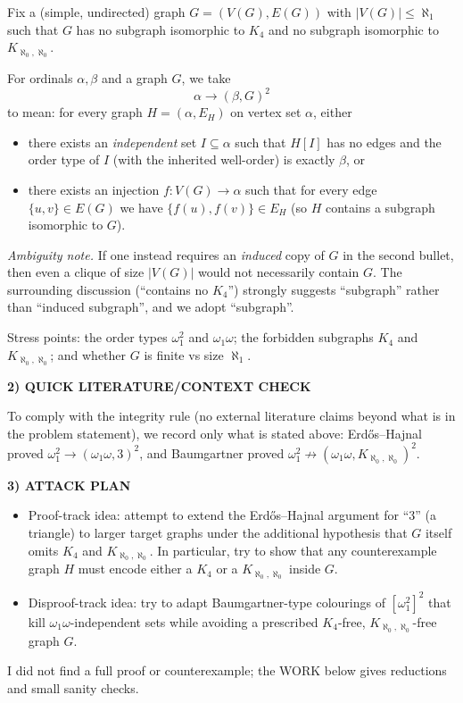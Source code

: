 Fix a (simple, undirected) graph $G=(V(G),E(G))$ with $|V(G)|\le\aleph_1$ such that $G$ has no subgraph isomorphic to $K_4$ and no subgraph isomorphic to $K_{\aleph_0,\aleph_0}$.

For ordinals $\alpha,\beta$ and a graph $G$, we take
\[
\alpha\to(\beta,G)^2
\]
to mean: for every graph $H=(\alpha,E_H)$ on vertex set $\alpha$, either
\begin{itemize}
\item there exists an \emph{independent} set $I\subseteq\alpha$ such that $H[I]$ has no edges and the order type of $I$ (with the inherited well-order) is exactly $\beta$, or
\item there exists an injection $f:V(G)\to\alpha$ such that for every edge $\{u,v\}\in E(G)$ we have $\{f(u),f(v)\}\in E_H$ (so $H$ contains a subgraph isomorphic to $G$).
\end{itemize}

\emph{Ambiguity note.} If one instead requires an \emph{induced} copy of $G$ in the second bullet, then even a clique of size $|V(G)|$ would not necessarily contain $G$. The surrounding discussion (``contains no $K_4$'') strongly suggests ``subgraph'' rather than ``induced subgraph'', and we adopt ``subgraph''.

Stress points: the order types $\omega_1^2$ and $\omega_1\omega$; the forbidden subgraphs $K_4$ and $K_{\aleph_0,\aleph_0}$; and whether $G$ is finite vs size $\aleph_1$.

\noindent\textbf{2) QUICK LITERATURE/CONTEXT CHECK}\par
To comply with the integrity rule (no external literature claims beyond what is in the problem statement), we record only what is stated above: Erd\H{o}s--Hajnal proved $\omega_1^2\to(\omega_1\omega,3)^2$, and Baumgartner proved $\omega_1^2\not\to(\omega_1\omega,K_{\aleph_0,\aleph_0})^2$.

\noindent\textbf{3) ATTACK PLAN}\par
\begin{itemize}
\item Proof-track idea: attempt to extend the Erd\H{o}s--Hajnal argument for ``3'' (a triangle) to larger target graphs under the additional hypothesis that $G$ itself omits $K_4$ and $K_{\aleph_0,\aleph_0}$. In particular, try to show that any counterexample graph $H$ must encode either a $K_4$ or a $K_{\aleph_0,\aleph_0}$ inside $G$.
\item Disproof-track idea: try to adapt Baumgartner-type colourings of $[\omega_1^2]^2$ that kill $\omega_1\omega$-independent sets while avoiding a prescribed $K_4$-free, $K_{\aleph_0,\aleph_0}$-free graph $G$.
\end{itemize}
I did not find a full proof or counterexample; the WORK below gives reductions and small sanity checks.


